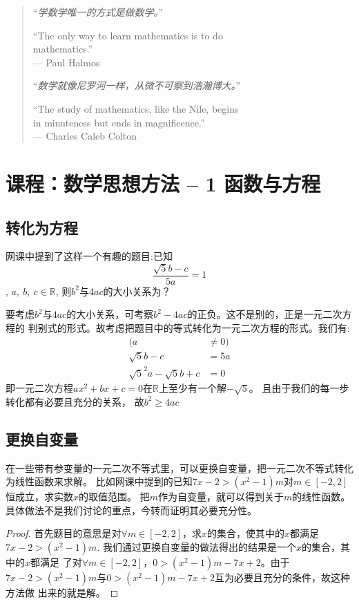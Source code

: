 \begin{quotation}
``\emph{学数学唯一的方式是做数学。}''

{\ttfamily ``The only way to learn mathematics is to do \\mathematics.''\\
--- Paul Halmos}

``\emph{数学就像尼罗河一样，从微不可察到浩瀚博大。}''

{\ttfamily ``The study of mathematics, like the Nile, begins \\
in minuteness but ends in magnificence.''\\
--- Charles Caleb Colton}
\end{quotation}

\section{课程：数学思想方法 -- 1 函数与方程}
\subsection{转化为方程}
网课中提到了这样一个有趣的题目:已知
\[
\frac{\sqrt{5}b - c}{5a} = 1
\],
$a,\ b,\ c \in \mathbb{R}$, 则\(b^2\)与\(4ac\)的大小关系为？

要考虑\(b^2\)与\(4ac\)的大小关系，可考察\(b^2 - 4ac\)的正负。这不是别的，正是一元二次方程的
判别式的形式。故考虑把题目中的等式转化为一元二次方程的形式。我们有:
\begin{align}
(a &\neq 0) \nonumber \\
\sqrt{5}b - c &= 5a \nonumber \\
\sqrt{5}^2a - \sqrt{5}b + c &= 0
\end{align}
即一元二次方程\(ax^2 + bx + c = 0\)在$\mathbb{R}$上至少有一个解$-\sqrt{5}$。
且由于我们的每一步转化都有必要且充分的关系，
故\(b^2 \geq 4ac\)

\subsection{更换自变量}
在一些带有参变量的一元二次不等式里，可以更换自变量，把一元二次不等式转化为线性函数来求解。
比如网课中提到的已知\(7x - 2 > (x^2 - 1)m\)对\(m \in [-2,2]\)恒成立，求实数$x$的取值范围。
把$m$作为自变量，就可以得到关于$m$的线性函数。具体做法不是我们讨论的重点，今转而证明其必要充分性。
\begin{proof}
首先题目的意思是对\(\forall m \in [-2,2]\)，求$x$的集合，使其中的$x$都满足
\(7x - 2 > (x^2 - 1)m\). 我们通过更换自变量的做法得出的结果是一个$x$的集合，其中的$x$都满足
了对\(\forall m \in [-2,2]\)，\(0 > (x^2 - 1)m - 7x + 2\)。由于
\(7x - 2 > (x^2 - 1)m\)与\(0 > (x^2 - 1)m - 7x + 2\)互为必要且充分的条件，故这种方法做
出来的就是解。
\end{proof}

